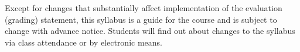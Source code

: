 Except for changes that substantially affect implementation of the evaluation (grading) statement, this syllabus is a guide for the course and is subject to change with advance notice. Students will find out about changes to the syllabus via class attendance or by electronic means.
